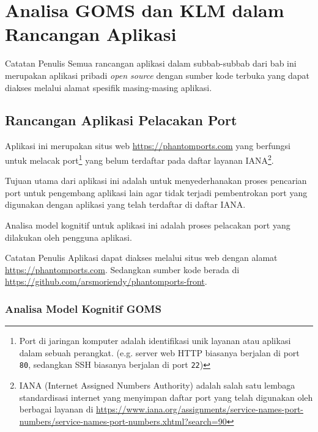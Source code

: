 \maketitle

\section{Analisa GOMS dan KLM dalam Rancangan Aplikasi}

\begin{info}{Catatan Penulis}
  Semua rancangan aplikasi dalam subbab-subbab dari bab ini
  merupakan aplikasi pribadi \textit{open source} dengan sumber kode
  terbuka yang dapat diakses melalui alamat spesifik masing-masing aplikasi.
\end{info}

\subsection{Rancangan Aplikasi Pelacakan Port}

Aplikasi ini merupakan situs web \url{https://phantomports.com} yang
berfungsi untuk melacak port\footnote{
  Port di jaringan komputer adalah identifikasi unik layanan atau
  aplikasi dalam sebuah perangkat. (e.g. server web HTTP biasanya
    berjalan di port \texttt{80}, sedangkan SSH biasanya berjalan di
  port \texttt{22})
}
yang belum terdaftar pada daftar layanan IANA\footnote{
  IANA (Internet Assigned Numbers Authority) adalah salah satu
  lembaga standardisasi internet yang  menyimpan daftar port yang
  telah digunakan oleh berbagai layanan di
  \url{https://www.iana.org/assignments/service-names-port-numbers/service-names-port-numbers.xhtml?search=90}
}.

Tujuan utama dari aplikasi ini adalah untuk menyederhanakan proses
pencarian port untuk pengembang aplikasi lain agar tidak terjadi
pembentrokan port yang digunakan dengan aplikasi yang telah terdaftar
di daftar IANA.

Analisa model kognitif untuk aplikasi ini adalah proses pelacakan
port yang dilakukan oleh pengguna aplikasi.

\begin{info}{Catatan Penulis}
  Aplikasi dapat diakses melalui situs web dengan alamat
  \url{https://phantomports.com}. Sedangkan sumber kode berada di
  \url{https://github.com/arsmoriendy/phantomports-front}.
\end{info}

\subsubsection{Analisa Model Kognitif GOMS}

